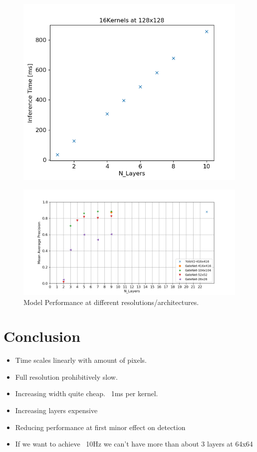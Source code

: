 \documentclass{article}
\begin{document}
\begin{figure}
	\begin{minipage}{0.5\textwidth}
	\includegraphics[width=\textwidth]{speed_layers}
\end{minipage}
\end{figure}


\begin{figure}
	\includegraphics[width=\textwidth]{map_res_layers}
	\caption{Model Performance at different resolutions/architectures.}
\end{figure}


\section{Conclusion}
\begin{itemize}
	\item Time scales linearly with amount of pixels.
	\item Full resolution prohibitively slow.
	\item Increasing width quite cheap. ~1ms per kernel.
	\item Increasing layers expensive
	\item Reducing performance at first minor effect on detection
	\item If we want to achieve ~10Hz we can't have more than about 3 layers at 64x64
\end{itemize}
\end{document}
